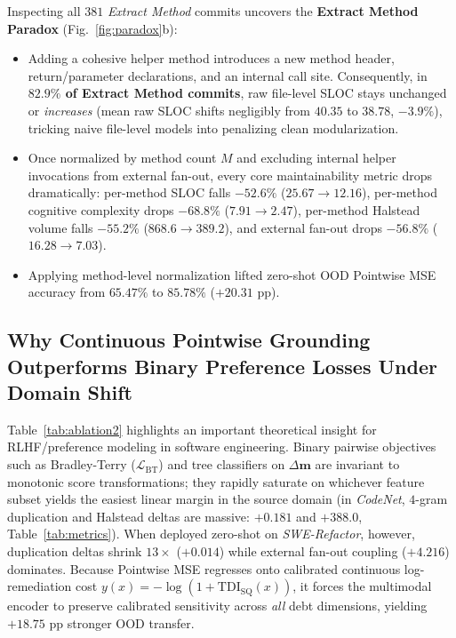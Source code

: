 \documentclass[conference]{IEEEtran}
\begin{document}
Inspecting all $381$ \textit{Extract Method} commits uncovers the \textbf{Extract Method Paradox} (Fig.~\ref{fig:paradox}b):
\begin{itemize}
    \item Adding a cohesive helper method introduces a new method header, return/parameter declarations, and an internal call site. Consequently, in \textbf{$82.9\%$ of Extract Method commits}, raw file-level SLOC stays unchanged or \emph{increases} (mean raw SLOC shifts negligibly from $40.35$ to $38.78$, $-3.9\%$), tricking naive file-level models into penalizing clean modularization.
    \item Once normalized by method count $M$ and excluding internal helper invocations from external fan-out, every core maintainability metric drops dramatically: per-method SLOC falls \textbf{$-52.6\%$} ($25.67 \to 12.16$), per-method cognitive complexity drops \textbf{$-68.8\%$} ($7.91 \to 2.47$), per-method Halstead volume falls \textbf{$-55.2\%$} ($868.6 \to 389.2$), and external fan-out drops \textbf{$-56.8\%$} ($16.28 \to 7.03$).
    \item Applying method-level normalization lifted zero-shot OOD Pointwise MSE accuracy from $65.47\%$ to \textbf{$85.78\%$} ($+20.31\text{ pp}$).
\end{itemize}

\subsection{Why Continuous Pointwise Grounding Outperforms Binary Preference Losses Under Domain Shift}
Table~\ref{tab:ablation2} highlights an important theoretical insight for RLHF/preference modeling in software engineering. Binary pairwise objectives such as Bradley-Terry ($\mathcal{L}_{\text{BT}}$) and tree classifiers on $\Delta\mathbf{m}$ are invariant to monotonic score transformations; they rapidly saturate on whichever feature subset yields the easiest linear margin in the source domain (in \textit{CodeNet}, $4$-gram duplication and Halstead deltas are massive: $+0.181$ and $+388.0$, Table~\ref{tab:metrics}). When deployed zero-shot on \textit{SWE-Refactor}, however, duplication deltas shrink $13\times$ ($+0.014$) while external fan-out coupling ($+4.216$) dominates. Because Pointwise MSE regresses onto calibrated continuous log-remediation cost $y(x) = -\log(1 + \text{TDI}_{\text{SQ}}(x))$, it forces the multimodal encoder to preserve calibrated sensitivity across \emph{all} debt dimensions, yielding $+18.75\text{ pp}$ stronger OOD transfer.
\end{document}
